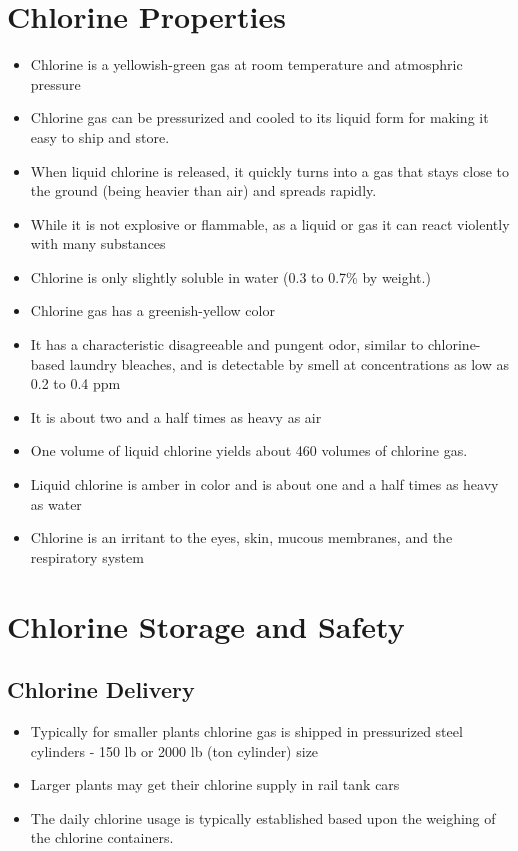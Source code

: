 \section{Chlorine Properties}

\begin{itemize}
\item Chlorine is a yellowish-green gas at room temperature and atmosphric pressure
\item Chlorine gas can be pressurized and cooled to its liquid form for making it easy to ship and store. 
\item When liquid chlorine is released, it quickly turns into a gas that stays close to the ground (being heavier than air) and spreads rapidly.
	\item 	While it is not explosive or flammable, as a liquid or gas it can react violently with many substances 
	\item Chlorine is only slightly soluble in water (0.3 to 0.7\% by weight.) 
	\item Chlorine gas has a greenish-yellow color 
	\item It has a characteristic disagreeable and pungent odor, similar to chlorine-based laundry bleaches, and is detectable by smell at concentrations as low as 0.2 to 0.4 ppm
	\item It is about two and a half times as heavy as air
	\item One volume of liquid chlorine yields about 460 volumes of chlorine gas. 
	\item Liquid chlorine is amber in color and is about one and a half times as heavy as water 
	\item Chlorine is an irritant to the eyes, skin, mucous membranes, and the respiratory system 
\end{itemize}


\section{Chlorine Storage and Safety}


\subsection{Chlorine Delivery}

\begin{itemize}
\item Typically for smaller plants chlorine gas is shipped in  pressurized steel cylinders - 150 lb or 2000 lb (ton cylinder) size
\item Larger plants may get their chlorine supply in rail tank cars
\item The daily chlorine usage is typically established based upon the weighing of the chlorine containers.
\end{itemize}


